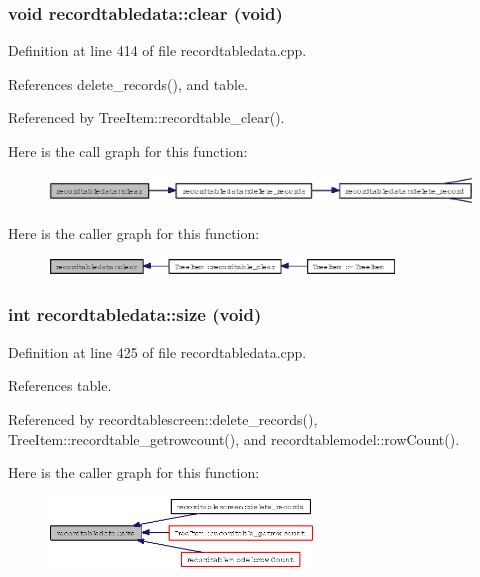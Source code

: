 \subsubsection{\setlength{\rightskip}{0pt plus 5cm}void recordtabledata::clear (void)}\label{classrecordtabledata_64bf565f5a8ef057d92db05b8478c4fe}




Definition at line 414 of file recordtabledata.cpp.

References delete\_\-records(), and table.

Referenced by Tree\-Item::recordtable\_\-clear().

Here is the call graph for this function:\begin{figure}[H]
\begin{center}
\leavevmode
\includegraphics[width=391pt]{classrecordtabledata_64bf565f5a8ef057d92db05b8478c4fe_cgraph}
\end{center}
\end{figure}


Here is the caller graph for this function:\begin{figure}[H]
\begin{center}
\leavevmode
\includegraphics[width=262pt]{classrecordtabledata_64bf565f5a8ef057d92db05b8478c4fe_icgraph}
\end{center}
\end{figure}
\subsubsection{\setlength{\rightskip}{0pt plus 5cm}int recordtabledata::size (void)}\label{classrecordtabledata_550a266ba595511d23216feb085853a9}




Definition at line 425 of file recordtabledata.cpp.

References table.

Referenced by recordtablescreen::delete\_\-records(), Tree\-Item::recordtable\_\-getrowcount(), and recordtablemodel::row\-Count().

Here is the caller graph for this function:\begin{figure}[H]
\begin{center}
\leavevmode
\includegraphics[width=200pt]{classrecordtabledata_550a266ba595511d23216feb085853a9_icgraph}
\end{center}
\end{figure}
